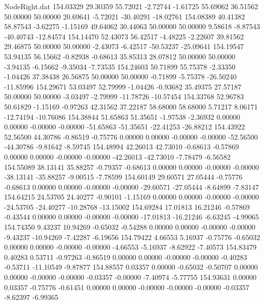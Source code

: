 \begin{filecontents}{NodeRight.dat}
 154.03329   29.30359   55.72021    -2.72744   -1.61725   55.69062   36.51562   50.00000   50.00000   20.69641   -5.72021  -30.40291  -18.02761
 154.08389   40.41382   58.87543    -3.62275   -1.15169   49.64062   30.44063   50.00000   50.00000    9.58618   -8.87543  -40.40743  -12.84574
 154.14470   52.43073   56.42517    -4.48225   -2.22607   39.81562   29.46875   50.00000   50.00000   -2.43073   -6.42517  -50.53237  -25.09641
 154.19547   53.94135   56.15662    -0.82938   -0.68613   35.85313   28.07812   50.00000   50.00000   -3.94135   -6.15662   -9.35034   -7.73535
 154.24603   50.71899   55.75378    -2.33350   -1.04426   37.38438   26.56875   50.00000   50.00000   -0.71899   -5.75378  -26.50240  -11.85996
 154.29671   53.03497   52.79999    -1.04426   -0.93682   35.49375   27.57187   50.00000   50.00000   -3.03497   -2.79999  -11.78726  -10.57454
 154.33768   52.96783   50.61829    -1.15169   -0.97263   42.31562   37.22187   58.68000   58.68000    5.71217    8.06171  -12.74194  -10.76086
 154.38844   51.65863   51.35651    -1.97538   -2.36932    0.00000    0.00000   -0.00000   -0.00000  -51.65863  -51.35651  -22.41253  -26.88212
 154.43922   52.56500   44.30786    -0.86519   -0.75776    0.00000    0.00000   -0.00000   -0.00000  -52.56500  -44.30786   -9.81642   -8.59745
 154.48994   42.26013   42.73010    -0.68613   -0.57869    0.00000    0.00000   -0.00000   -0.00000  -42.26013  -42.73010   -7.78479   -6.56582
 154.55089   38.13141   35.88257    -0.79357   -0.68613    0.00000    0.00000   -0.00000   -0.00000  -38.13141  -35.88257   -9.00515   -7.78599
 154.60149   29.60571   27.05444    -0.75776   -0.68613    0.00000    0.00000   -0.00000   -0.00000  -29.60571  -27.05444   -8.64899   -7.83147
 154.64215   24.53705   24.40277    -0.90101   -1.15169    0.00000    0.00000   -0.00000   -0.00000  -24.53705  -24.40277  -10.28768  -13.15002
 154.69284   17.01813   16.21246    -0.57869   -0.43544    0.00000    0.00000   -0.00000   -0.00000  -17.01813  -16.21246   -6.63245   -4.99065
 154.74350    9.43237   10.94269    -0.65032   -0.54288    0.00000    0.00000   -0.00000   -0.00000   -9.43237  -10.94269   -7.42287   -6.19656
 154.79422    4.66553    5.16937    -0.75776   -0.65032    0.00000    0.00000   -0.00000   -0.00000   -4.66553   -5.16937   -8.62922   -7.40573
 154.83479    0.40283    0.53711    -0.97263   -0.86519    0.00000    0.00000   -0.00000   -0.00000   -0.40283   -0.53711  -11.10549   -9.87877
 154.88557    0.03357    0.00000    -0.65032   -0.50707    0.00000    0.00000   -0.00000   -0.00000   -0.03357   -0.00000   -7.40974   -5.77755
 154.93631    0.00000    0.03357    -0.75776   -0.61451    0.00000    0.00000   -0.00000   -0.00000   -0.00000   -0.03357   -8.62397   -6.99365

\end{filecontents}

